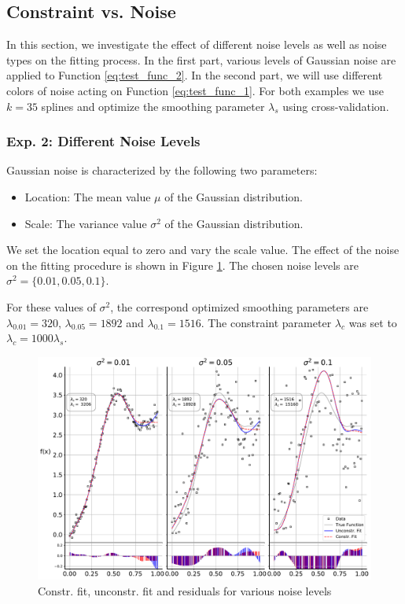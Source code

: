 \documentclass[10pt,a4paper]{article}
\begin{document}
\subsection{Constraint vs. Noise} \label{subsec:constraint-vs-noise}

In this section, we investigate the effect of different noise levels as well as noise types on the fitting process. In the first part, various levels of Gaussian noise are applied to Function \ref{eq:test_func_2}. In the second part, we will use different colors of noise acting on Function \ref{eq:test_func_1}. For both examples we use $k=35$ splines and optimize the smoothing parameter $\lambda_s$ using cross-validation. 

\subsubsection{Exp. 2: Different Noise Levels}

Gaussian noise is characterized by the following two parameters:
\begin{itemize}
	\item Location: The mean value $\mu$ of the Gaussian distribution.
	\item Scale: The variance value $\sigma^2$ of the Gaussian distribution.
\end{itemize}

We set the location equal to zero and vary the scale value. The effect of the noise on the fitting procedure is shown in Figure \ref{fig:fit_noise_levels}. The chosen noise levels are $\sigma^2 = \{0.01, 0.05, 0.1\}$.

For these values of $\sigma^2$, the correspond optimized smoothing parameters are $\lambda_{0.01} = 320$, $\lambda_{0.05} = 1892$ and $\lambda_{0.1} = 1516$. The constraint parameter $\lambda_c$ was set to $\lambda_c = 1000 \lambda_s$. 

\begin{figure}[H]
	\centering
	\includegraphics[width=\columnwidth]{../thesisplots/exp_noise_levels.pdf}
	\caption{Constr. fit, unconstr. fit and residuals for various noise levels}
	\label{fig:fit_noise_levels}
\end{figure}
\end{document}
